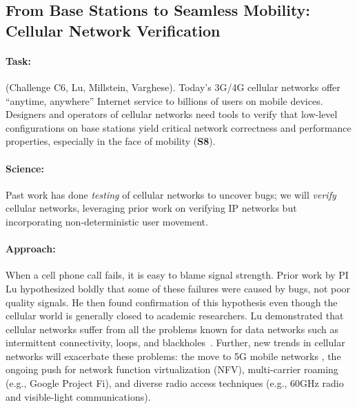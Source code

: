 \subsection{From Base Stations to Seamless Mobility: Cellular Network Verification}

\paragraph*{Task:} (Challenge C6, Lu, Millstein, Varghese). Today's 3G/4G cellular networks offer ``anytime, anywhere'' Internet service to billions of users on mobile devices.  Designers and operators of cellular networks need tools to verify that low-level configurations on base stations yield critical network correctness and performance properties, especially in the face of mobility (\textbf{S8}).

\paragraph*{Science:} Past work has done {\em testing} of cellular networks to uncover bugs; we will {\em verify} cellular networks, leveraging prior work on verifying IP networks but incorporating non-deterministic user movement.


\paragraph*{Approach:} When a cell phone call fails, it is easy to blame signal strength.  Prior work by PI Lu hypothesized boldly that some of these failures were caused by bugs, not poor quality signals.  He then found confirmation of this hypothesis even though the cellular world is generally closed to academic researchers.  Lu demonstrated that  cellular networks suffer from all the problems known for data networks such as intermittent connectivity, loops, and blackholes~\cite{tudetecting, tu14-sigcomm, li16-hotmobile, li2016instability, li16-nsdi, peng16-icccn}.  Further, new trends in cellular networks will exacerbate these problems:
the move to 5G mobile networks \cite{5g-white-house, 5g-gsma, 5g-huawei, fi}, the ongoing push for network function virtualization (NFV), multi-carrier roaming (e.g., Google Project Fi), and diverse radio access techniques (e.g., 60GHz radio and visible-light communications).  

